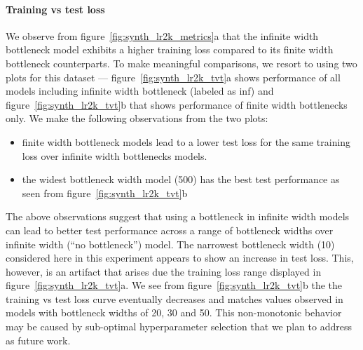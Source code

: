 \documentclass{article}
\theoremstyle{definition}
\theoremstyle{remark}
\renewcommand{\[}{\begin{eqnarray}}
\renewcommand{\]}{\end{eqnarray}}
\renewcommand{\[}{\begin{eqnarray}}
\renewcommand{\]}{\end{eqnarray}}
\begin{document}
\paragraph{Training vs test loss}
We observe from figure~\ref{fig:synth_lr2k_metrics}a that the infinite width bottleneck model exhibits a higher training loss compared to its finite width bottleneck counterparts. To make meaningful comparisons, we resort to using two plots for this dataset --- figure~\ref{fig:synth_lr2k_tvt}a shows performance of all models including infinite width bottleneck (labeled as inf) and figure~\ref{fig:synth_lr2k_tvt}b that shows performance of finite width bottlenecks only. We make the following observations from the two plots:
\begin{itemize}
    \item finite width bottleneck models lead to a lower test loss for the same training loss over infinite width bottlenecks models.
\item the widest bottleneck width model (500) has the best test performance as seen from figure~\ref{fig:synth_lr2k_tvt}b
\end{itemize}
The above observations suggest that using a bottleneck in infinite width models can lead to better test performance across a range of bottleneck widths over infinite width (``no bottleneck'') model. The narrowest bottleneck width (10) considered here in this experiment appears to show an increase in test loss. This, however, is an artifact that arises due the training loss range displayed in figure~\ref{fig:synth_lr2k_tvt}a. We see from figure~\ref{fig:synth_lr2k_tvt}b the the training vs test loss curve eventually decreases and matches values observed in models with bottleneck widths of 20, 30 and 50. This non-monotonic behavior may be caused by sub-optimal hyperparameter selection that we plan to address as future work.
\end{document}
